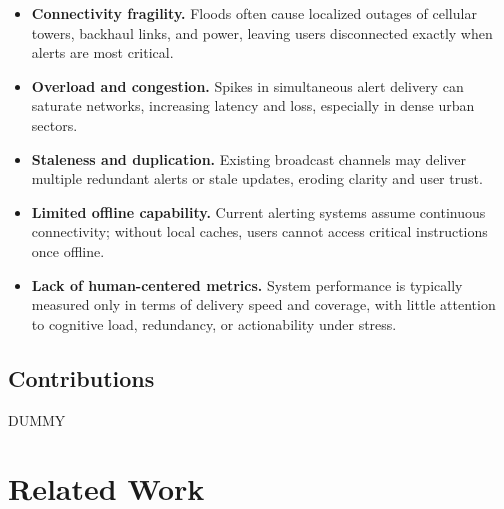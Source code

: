 \documentclass[11pt,twocolumn]{article}
\begin{document}
\begin{itemize}
    \item \textbf{Connectivity fragility.} Floods often cause localized outages of cellular towers, backhaul links, and power, leaving users disconnected exactly when alerts are most critical.
    \item \textbf{Overload and congestion.} Spikes in simultaneous alert delivery can saturate networks, increasing latency and loss, especially in dense urban sectors.
    \item \textbf{Staleness and duplication.} Existing broadcast channels may deliver multiple redundant alerts or stale updates, eroding clarity and user trust.
    \item \textbf{Limited offline capability.} Current alerting systems assume continuous connectivity; without local caches, users cannot access critical instructions once offline.
    \item \textbf{Lack of human-centered metrics.} System performance is typically measured only in terms of delivery speed and coverage, with little attention to cognitive load, redundancy, or actionability under stress.
\end{itemize}

\subsection{Contributions}
DUMMY

\section{Related Work}
\end{document}
